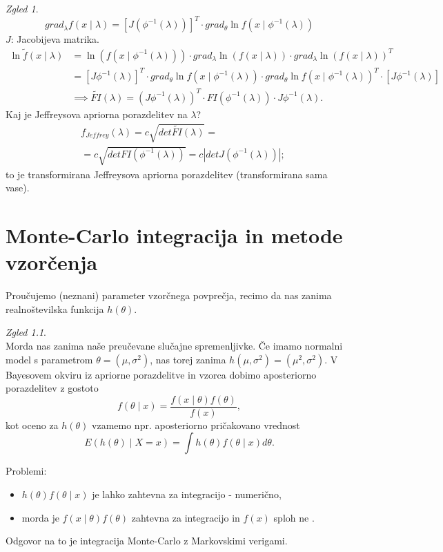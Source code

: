 \documentclass[a4paper, 12pt]{book}
\theoremstyle{definition}
\theoremstyle{remark}
\newtheorem*{exmp}{Zgled}
\begin{document}
\begin{exmp}
\begin{equation*}
    grad_{\lambda} f(x \mid \lambda) = [J(\phi^{-1}(\lambda))]^T \cdot grad_{\theta} \ln f (x \mid \phi^{-1}(\lambda))
  \end{equation*}
  $J$: Jacobijeva matrika.
  \begin{align*}
    \ln \widetilde{f}(x \mid \lambda) &= \ln(f(x \mid \phi^{-1}(\lambda))) \cdot
      grad_{\lambda} \ln(f(x \mid \lambda)) \cdot grad_{\lambda} \ln(f(x \mid \lambda))^T \\
    &= [J \phi^{-1}(\lambda)]^T \cdot grad_{\theta} \ln f (x \mid \phi^{-1}(\lambda)) \cdot
      grad_{\theta} \ln f (x \mid \phi^{-1}(\lambda))^T \cdot [J \phi^{-1}(\lambda)] \\
    &\implies \widetilde{FI}(\lambda) = (J \phi^{-1}(\lambda))^T \cdot
      FI(\phi^{-1}(\lambda)) \cdot J \phi^{-1}(\lambda).      
  \end{align*}
  Kaj je Jeffreysova apriorna porazdelitev na $\lambda$?
  \begin{align*}
    &f_{Jeffrey}(\lambda) = c \sqrt{det \widetilde{FI}(\lambda)} = \\
    &= c \sqrt{det FI (\phi^{-1}(\lambda))} = c |det J(\phi^{-1}(\lambda))|;
  \end{align*}
  to je transformirana Jeffreysova apriorna porazdelitev (transformirana sama vase).
\end{exmp}



\chapter{Monte-Carlo integracija in metode vzorčenja}


Proučujemo (neznani) parameter vzorčnega povprečja, recimo da nas zanima realnoštevilska funkcija $h(\theta)$.
\begin{exmp} \text{} \\
  Morda nas zanima  naše preučevane slučajne spremenljivke.
  Če imamo normalni model s parametrom $\theta = (\mu, \sigma^2)$, nas torej zanima $h(\mu, \sigma^2) = (\mu^2, \sigma^2)$.
  V Bayesovem okviru iz apriorne porazdelitve in vzorca dobimo aposteriorno porazdelitev z gostoto
  \begin{equation*}
    f(\theta \mid x) = \frac{f(x \mid \theta) f(\theta)}{f(x)},
  \end{equation*}
  kot oceno za $h(\theta)$ vzamemo npr. aposteriorno pričakovano vrednost
  \begin{equation*}
    E(h(\theta) \mid X = x) = \int h(\theta) f(\theta \mid x) d\theta.
  \end{equation*}
\end{exmp}
Problemi:
\begin{itemize}
  \item $h(\theta) f(\theta \mid x)$ je lahko zahtevna za integracijo - numerično,
  \item morda je  $f(x \mid \theta) f(\theta)$ zahtevna za integracijo in $f(x)$ sploh ne .
\end{itemize}
Odgovor na to je integracija Monte-Carlo z Markovskimi verigami.
\end{document}
